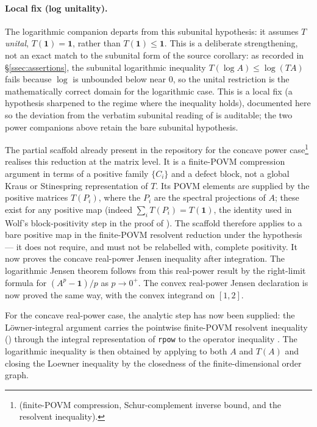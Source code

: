\documentclass{article}
\begin{document}
\paragraph{Local fix (log unitality).}  The logarithmic companion
 departs from this subunital hypothesis: it
assumes $T$ \emph{unital}, $T(\mathbf 1)=\mathbf 1$, rather than $T(\mathbf
1)\le\mathbf 1$.  This is a deliberate strengthening, not an exact match to the
subunital form of the source corollary: as recorded in \S\ref{ssec:assertions},
the subunital logarithmic inequality $T(\log A)\le\log(TA)$ fails because $\log$
is unbounded below near $0$, so the unital restriction is the mathematically
correct domain for the logarithmic case.  This is a local fix (a hypothesis
sharpened to the regime where the inequality holds), documented here so the
deviation from the verbatim subunital reading of
\cite[Corollary~5.2]{Wolf2012Quantum} is auditable; the two power companions
above retain the bare subunital hypothesis.

The partial scaffold already present in the repository for the concave power
case\footnote{%
     (finite-POVM compression,
    Schur-complement inverse bound, and the resolvent inequality).}
realises this reduction at the matrix level.  It is a finite-POVM compression
argument in terms of a positive family $\{C_i\}$ and a defect block, not a global
Kraus or Stinespring representation of $T$.  Its POVM elements are supplied by
the positive matrices $T(P_i)$, where the $P_i$ are the spectral projections of
$A$; these exist for any positive map (indeed $\sum_i T(P_i)=T(\mathbf 1)$, the
identity used in Wolf's block-positivity step in the proof of
  \cite[Theorem~5.12]{Wolf2012Quantum}).  The scaffold
  therefore applies to a bare positive map in the finite-POVM resolvent reduction
  under the  hypothesis --- it does not require, and must not
  be relabelled with, complete positivity.  It now proves the concave
  real-power Jensen inequality after integration.  The logarithmic Jensen theorem
  follows from this real-power result by the right-limit formula for
  $(A^p-\mathbf 1)/p$ as $p\to 0^+$.  The convex real-power Jensen declaration
  is now proved the same way, with the convex integrand on $[1,2]$.

For the concave real-power case, the analytic step has now been supplied: the
Löwner-integral argument carries the pointwise finite-POVM resolvent inequality
() through the integral representation of
\texttt{rpow} to the operator inequality
.  The logarithmic inequality
 is then obtained by applying
 to both $A$ and $T(A)$ and closing the
Loewner inequality by the closedness of the finite-dimensional order graph.
\end{document}
